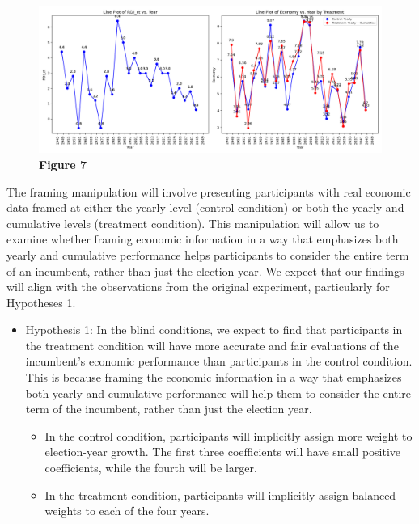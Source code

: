 \documentclass[
]{article}
\providecommand{\tightlist}{%
  \setlength{\itemsep}{0pt}\setlength{\parskip}{0pt}}
\begin{document}
\begin{figure}
\centering
\includegraphics{difcum2.png}
\caption{\textbf{Figure 7}}
\end{figure}

The framing manipulation will involve presenting participants with real
economic data framed at either the yearly level (control condition) or
both the yearly and cumulative levels (treatment condition). This
manipulation will allow us to examine whether framing economic
information in a way that emphasizes both yearly and cumulative
performance helps participants to consider the entire term of an
incumbent, rather than just the election year. We expect that our
findings will align with the observations from the original experiment,
particularly for Hypotheses 1.

\begin{itemize}
\tightlist
\item
  Hypothesis 1: In the blind conditions, we expect to find that
  participants in the treatment condition will have more accurate and
  fair evaluations of the incumbent's economic performance than
  participants in the control condition. This is because framing the
  economic information in a way that emphasizes both yearly and
  cumulative performance will help them to consider the entire term of
  the incumbent, rather than just the election year.

  \begin{itemize}
  \tightlist
  \item
    In the control condition, participants will implicitly assign more
    weight to election-year growth. The first three coefficients will
    have small positive coefficients, while the fourth will be larger.
  \item
    In the treatment condition, participants will implicitly assign
    balanced weights to each of the four years.
  \end{itemize}
\end{itemize}
\end{document}
